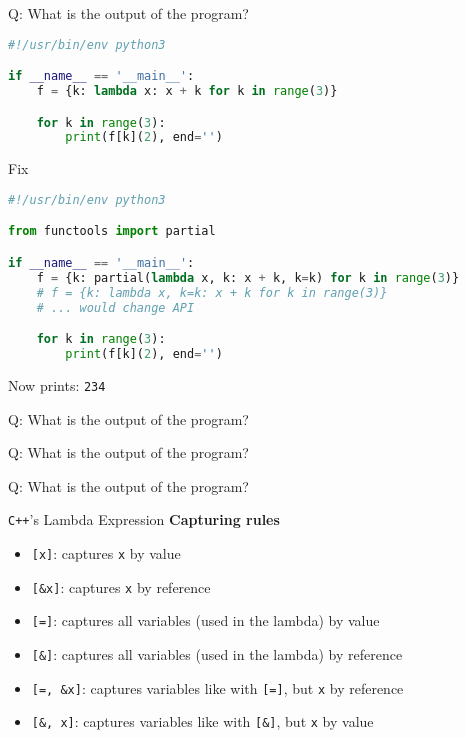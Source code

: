 \begin{frame}[fragile]{Q: What is the output of the program?}
    \begin{lstlisting}[language=python]
#!/usr/bin/env python3

if __name__ == '__main__':
    f = {k: lambda x: x + k for k in range(3)}

    for k in range(3):
        print(f[k](2), end='')
    \end{lstlisting}
\end{frame}


\begin{frame}[fragile]{Fix}
    \begin{lstlisting}[language=python]
#!/usr/bin/env python3

from functools import partial

if __name__ == '__main__':
    f = {k: partial(lambda x, k: x + k, k=k) for k in range(3)}
    # f = {k: lambda x, k=k: x + k for k in range(3)}
    # ... would change API

    for k in range(3):
        print(f[k](2), end='')
    \end{lstlisting}
    
    Now prints: \texttt{234}
\end{frame}

\begin{frame}[fragile]{Q: What is the output of the program?}

\end{frame}

\begin{frame}[fragile]{Q: What is the output of the program?}
\end{frame}


\begin{frame}[fragile]{Q: What is the output of the program?}
\end{frame}


\begin{frame}[fragile]{\texttt{C++}'s Lambda Expression}
    \textbf{Capturing rules}
    \begin{itemize}
        \item \texttt{[x]}: captures \texttt{x} by value
        \item \texttt{[\&x]}: captures \texttt{x} by reference
        \item \texttt{[=]}: captures all variables (used in the lambda) by value
        \item \texttt{[\&]}: captures all variables (used in the lambda) by reference
        \item \texttt{[=, \&x]}: captures variables like with \texttt{[=]}, but \texttt{x} by reference
        \item \texttt{[\&, x]}: captures variables like with \texttt{[\&]}, but \texttt{x} by value
    \end{itemize}
\end{frame}


